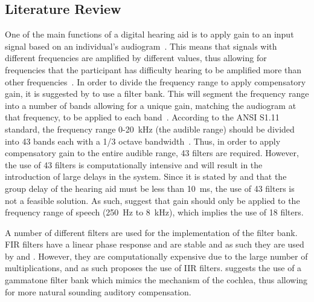 \documentclass[10pt,twocolumn]{witseiepaper}
\begin{document}
\subsection{Literature Review}
One of the main functions of a digital hearing aid is to apply gain to an input signal based on an individual's audiogram~\cite{Survey_of_Filter_Bank_Algorithms}. This means that signals with different frequencies are amplified by different values, thus allowing for frequencies that the participant has difficulty hearing to be amplified more than other frequencies~\cite{Complexity_effective_auditory_compensation}. In order to divide the frequency range to apply compensatory gain, it is suggested by \cite{Survey_of_Filter_Bank_Algorithms, Complexity_effective_auditory_compensation, design_of_IIR_based_digital_hearing_aids, 16-Band_Reconfigurable_Hearing_Aid, Digital_filter_bank_for_hearing_aid, Loudness_compensation_method_based_on_human_auditory} to use a filter bank. This will segment the frequency range into a number of bands allowing for a unique gain, matching the audiogram at that frequency, to be applied to each band~\cite{16-Band_Reconfigurable_Hearing_Aid}. According to the ANSI S1.11 standard, the frequency range 0-20~kHz (the audible range) should be divided into 43 bands each with a 1/3 octave bandwidth~\cite{Survey_of_Filter_Bank_Algorithms, Complexity_effective_auditory_compensation}. Thus, in order to apply compensatory gain to the entire audible range, 43 filters are required. However, the use of 43 filters is computationally intensive and will result in the introduction of large delays in the system. Since it is stated by \cite{An_Ultra_Low-power_Programmable_DSP_System} and \cite{Complexity-effective_auditory_compensation_controllable_filter} that the group delay of the hearing aid must be less than 10~ms, the use of 43 filters is not a feasible solution. As such, \cite{16-Band_Reconfigurable_Hearing_Aid, Survey_of_Filter_Bank_Algorithms, Complexity_effective_auditory_compensation} suggest that gain should only be applied to the frequency range of speech (250~Hz to 8~kHz), which implies the use of 18 filters.

A number of different filters are used for the implementation of the filter bank. FIR filters have a linear phase response and are stable and as such they are used by \cite{Digital_filter_bank_for_hearing_aid} and \cite{Complexity-effective_auditory_compensation_controllable_filter}. However, they are computationally expensive due to the large number of multiplications, and as such \cite{Complexity_effective_auditory_compensation} proposes the use of IIR filters. \cite{Loudness_compensation_method_based_on_human_auditory} suggests the use of a gammatone filter bank which mimics the mechanism of the cochlea, thus allowing for more natural sounding auditory compensation. 
\end{document}
